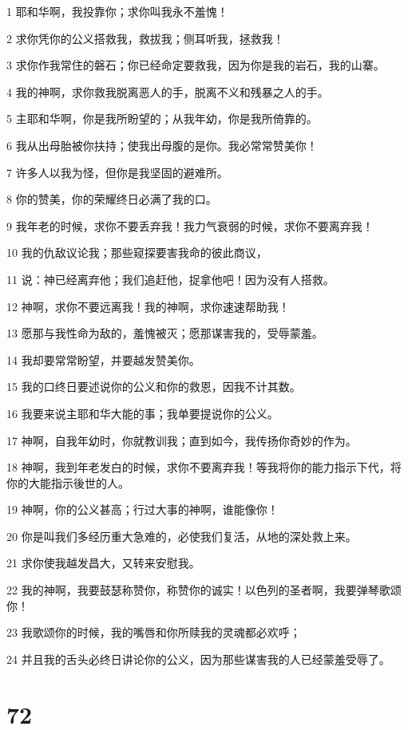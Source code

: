 \par 1 耶和华啊，我投靠你；求你叫我永不羞愧！
\par 2 求你凭你的公义搭救我，救拔我；侧耳听我，拯救我！
\par 3 求你作我常住的磐石；你已经命定要救我，因为你是我的岩石，我的山寨。
\par 4 我的神啊，求你救我脱离恶人的手，脱离不义和残暴之人的手。
\par 5 主耶和华啊，你是我所盼望的；从我年幼，你是我所倚靠的。
\par 6 我从出母胎被你扶持；使我出母腹的是你。我必常常赞美你！
\par 7 许多人以我为怪，但你是我坚固的避难所。
\par 8 你的赞美，你的荣耀终日必满了我的口。
\par 9 我年老的时候，求你不要丢弃我！我力气衰弱的时候，求你不要离弃我！
\par 10 我的仇敌议论我；那些窥探要害我命的彼此商议，
\par 11 说：神已经离弃他；我们追赶他，捉拿他吧！因为没有人搭救。
\par 12 神啊，求你不要远离我！我的神啊，求你速速帮助我！
\par 13 愿那与我性命为敌的，羞愧被灭；愿那谋害我的，受辱蒙羞。
\par 14 我却要常常盼望，并要越发赞美你。
\par 15 我的口终日要述说你的公义和你的救恩，因我不计其数。
\par 16 我要来说主耶和华大能的事；我单要提说你的公义。
\par 17 神啊，自我年幼时，你就教训我；直到如今，我传扬你奇妙的作为。
\par 18 神啊，我到年老发白的时候，求你不要离弃我！等我将你的能力指示下代，将你的大能指示後世的人。
\par 19 神啊，你的公义甚高；行过大事的神啊，谁能像你！
\par 20 你是叫我们多经历重大急难的，必使我们复活，从地的深处救上来。
\par 21 求你使我越发昌大，又转来安慰我。
\par 22 我的神啊，我要鼓瑟称赞你，称赞你的诚实！以色列的圣者啊，我要弹琴歌颂你！
\par 23 我歌颂你的时候，我的嘴唇和你所赎我的灵魂都必欢呼；
\par 24 并且我的舌头必终日讲论你的公义，因为那些谋害我的人已经蒙羞受辱了。

\chapter{72}

